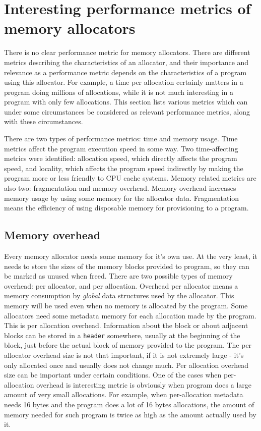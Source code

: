 \section{Interesting performance metrics of memory allocators}
\label{metrics}

There is no clear performance metric for memory allocators. There are different metrics describing the characteristics of an allocator, and their importance and relevance as a performance metric depends on the characteristics of a program using this allocator. For example, a time per allocation certainly matters in a program doing millions of allocations, while it is not much interesting in a program with only few allocations. This section lists various metrics which can under some circumstances be considered as relevant performance metrics, along with these circumstances.

There are two types of performance metrics: time and memory usage. Time metrics affect the program execution speed in some way. Two time-affecting metrics were identified: allocation speed, which directly affects the program speed, and locality, which affects the program speed indirectly by making the program more or less friendly to CPU cache systems. Memory related metrics are also two: fragmentation and memory overhead. Memory overhead increases memory usage by using some memory for the allocator data. Fragmentation means the efficiency of using disposable memory for provisioning to a program.

\subsection{Memory overhead}
\label{metrics:overhead}

Every memory allocator needs some memory for it's own use. At the very least, it needs to store the sizes of the memory blocks provided to program, so they can be marked as unused when freed. There are two possible types of memory overhead: per allocator, and per allocation. Overhead per allocator means a memory consumption by {\em global} data structures used by the allocator. This memory will be used even when no memory is allocated by the program. Some allocators need some metadata memory for each allocation made by the program. This is per allocation overhead. Information about the block or about adjacent blocks can be stored in a {\tt header} somewhere, usually at the beginning of the block, just before the actual block of memory provided to the program. The per allocator overhead size is not that important, if it is not extremely large - it's only allocated once and usually does not change much. Per allocation overhead size can be important under certain conditions. One of the cases when per-allocation overhead is interesting metric is obviously when program does a large amount of very small allocations. For example, when per-allocation metadata needs 16 bytes and the program does a lot of 16 bytes allocations, the amount of memory needed for such program is twice as high as the amount actually used by it. 

